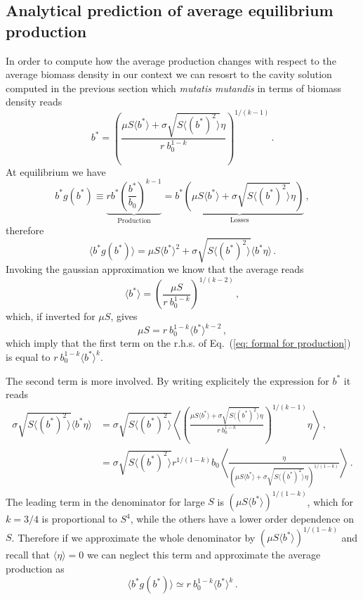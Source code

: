 \documentclass[10pt]{article}
\begin{document}
\subsection{Analytical prediction of average equilibrium production}
In order to compute how the average production changes with respect to 
the average biomass density in our context we can resosrt to the cavity
solution computed in the previous section which \textit{mutatis mutandis}
in terms of biomass density reads
\begin{equation}
    b^* = \left(\frac{\mu S \langle b^* \rangle + \sigma \sqrt{S\langle (b^*)^2\rangle} \eta}
    {r \ b_0^{1-k}}\right)^{1/(k-1)} \, .
    \label{eq: cavity solution biomass}
\end{equation}
At equilibrium we have
\begin{equation}
    b^*g(b^*)\equiv\underbrace{rb^*\left(\frac{b^*}{b_0}\right)^{k -1}}_\text{Production}
    = \underbrace{b^*(\mu S \langle b^* \rangle + \sigma \sqrt{S\langle (b^*)^2\rangle} \eta)}_\text{Losses} \, ,
\end{equation}
therefore
\begin{equation}
    \langle b^*g(b^*)\rangle =  \mu S \langle b^* \rangle^2 + 
    \sigma \sqrt{S\langle (b^*)^2\rangle} \langle b^*\eta\rangle \, .
    \label{eq: formal for production}
\end{equation}
Invoking the gaussian approximation we know that the average reads
\begin{equation}
    \langle b^*\rangle = \left(\frac{\mu S}{r \ b_0^{1-k}}\right)^{1/(k-2)} \, ,
\end{equation}
which, if inverted for $\mu S$, gives
\begin{equation}
    \mu S = r \ b_0^{1-k} \langle b^*\rangle^{k-2} \, ,
\end{equation}
which imply that the first term on the r.h.s. of Eq.~(\ref{eq: formal for production}) is
equal to $r \ b_0^{1-k}\langle b^* \rangle^k$.

The second term is more involved. By writing explicitely the expression for
$b^*$ it reads
\begin{align}
    \sigma \sqrt{S\langle (b^*)^2\rangle} \langle b^*\eta\rangle &= 
    \sigma \sqrt{S\langle (b^*)^2\rangle}
    \left\langle  \left(\frac{\mu S \langle b^* \rangle + \sigma \sqrt{S\langle (b^*)^2\rangle} \eta}
    {r \ b_0^{1-k}}\right)^{1/(k-1)} \eta\right\rangle \nonumber \, ,\\
    &= \sigma \sqrt{S\langle (b^*)^2\rangle} r^{1/(1-k)}b_0
    \left\langle  \frac{\eta}{(\mu S \langle b^* \rangle + 
    \sigma \sqrt{S\langle (b^*)^2\rangle} \eta)^{1/(1-k)}}\right\rangle \, .
\end{align}
The leading term in the denominator for large $S$ is
$(\mu S \langle b^* \rangle)^{1/(1-k)}$, which for $k=3/4$ is proportional
to $S^4$, while the others have a lower order dependence on $S$. Therefore
if we approximate the whole denominator by $(\mu S \langle b^* \rangle)^{1/(1-k)}$ 
and recall that $\langle \eta \rangle=0$ we can neglect this term
and approximate the average production as
\begin{equation}
    \langle b^*g(b^*)\rangle \simeq r \ b_0^{1-k}\langle b^*\rangle^k \, .
\end{equation}
\end{document}
